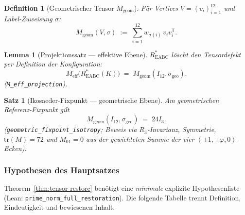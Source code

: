 \documentclass[11pt,a4paper]{article}
\newtheorem{theorem}{Satz}
\newtheorem{definition}{Definition}
\newtheorem{lemma}{Lemma}
\begin{document}
	\begin{definition}[Geometrischer Tensor $M_{\mathrm{geom}}$]
		\label{def:m-geom}
		Für Vertices $V=(v_i)_{i=1}^{12}$ und Label-Zuweisung $\sigma$:
		\[
		M_{\mathrm{geom}}(V,\sigma)
		\;:=\;
		\sum_{i=1}^{12} w_{\sigma(i)}\, v_i v_i^{\mathsf T}.
		\]
	\end{definition}
	
	\begin{lemma}[Projektionssatz — effektive Ebene]
		\label{lem:tensor-projection}
		$R^*_{\mathrm{EABC}}$ löscht den Tensordefekt per Definition der Konfiguration:
		\[
		M_{\mathrm{eff}}\bigl(R^*_{\mathrm{EABC}}(K)\bigr)
		\;=\;
		M_{\mathrm{geom}}(I_{12},\sigma_{\mathrm{geo}}).
		\]
		(\texttt{M\_eff\_projection}).
	\end{lemma}
	
	\begin{theorem}[Ikosaeder-Fixpunkt — geometrische Ebene]
		\label{thm:geom-fixpoint}
		Am geometrischen Referenz-Fixpunkt gilt
		\[
		\boxed{
			M_{\mathrm{geom}}(I_{12},\sigma_{\mathrm{geo}})
			\;=\;
			24I_3
		}.
		\]
		(\texttt{geometric\_fixpoint\_isotropy}; Beweis via $R_3$-Invarianz,
		Symmetrie, $\mathrm{tr}(M)=72$ und $M_{01}=0$ aus der gewichteten Summe der
		vier $(\pm1,\pm\varphi,0)$-Ecken).
	\end{theorem}
	
	\subsubsection{Hypothesen des Hauptsatzes}
	\label{sec:main-hypotheses}
	
	Theorem~\ref{thm:tensor-restore} benötigt eine \emph{minimale} explizite
	Hypothesenliste (Lean: \texttt{prime\_norm\_full\_restoration}).
	Die folgende Tabelle trennt Definition, Eindeutigkeit und bewiesenen Inhalt.
	
\end{document}
